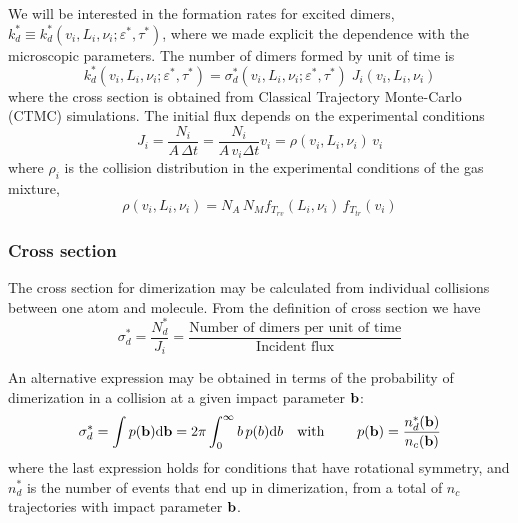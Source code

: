 We will be interested in the formation rates for excited dimers, $k_{d}^{*} \equiv k_{d}^{*}(v_{i}, L_{i}, \nu_{i} ; \varepsilon^{*}, \tau^{*})$, where we made explicit the dependence with the microscopic parameters. The number of dimers formed by unit of time is
\begin{equation}
  \label{Q:def-dimer-rate}
  k_{d}^{*}(v_{i}, L_{i}, \nu_{i} ; \varepsilon^{*}, \tau^{*}) = \sigma_{d}^{*}(v_{i}, L_{i}, \nu_{i} ; \varepsilon^{*}, \tau^{*}) \; J_{i}(v_{i}, L_{i}, \nu_{i} )
\end{equation}
where the cross section is obtained from Classical Trajectory Monte-Carlo (CTMC) simulations. The initial flux depends on the experimental conditions
\begin{equation}
  \label{Q:rates-flux}
  J_{i} =\frac{N_{i}}{A \,\Delta t} = \frac{N_{i}}{A \, v_{i} \Delta t} v_{i} = \rho(v_{i}, L_{i}, \nu_{i})\, v_{i}
\end{equation}
%
where $\rho_{i}$ is the collision distribution in the experimental conditions of the gas mixture,
\begin{equation}
  \label{Q:rates-def-collis-distrib}
  \rho(v_{i}, L_{i}, \nu_{i}) = N_{A} \, N_{M} f_{T_{rv}}(L_{i},\nu_{i}) \, f_{T_{tr}}(v_{i})
\end{equation}

\subsubsection{Cross section}
\label{S:cross-section}

The cross section for dimerization may be calculated from individual collisions between one atom and molecule. 
From the definition of cross section we have
\begin{equation*}
  \sigma_{d}^{*} = \frac{N_{d}^{*}}{J_{i}}= \frac{\text{Number of dimers per unit of time}}{\text{Incident flux}}
\end{equation*}

An alternative expression may be obtained in terms of the probability of dimerization in a collision at a given impact parameter $\mathbf{b}$:
\begin{align}
  \label{Q:rates-def-probab}
  \sigma_{d}^{*} = \int p(\mathbf{b}) \mathrm{d} \mathbf{b} = 2 \pi \int_{0}^{\infty} b \, p(b) \mathrm{d} b & \quad \text{with } \quad & p(\mathbf{b}) = \frac{n_{d}^{*}(\mathbf{b})}{n_{c}(\mathbf{b})}
\end{align}
where the last expression holds for conditions that have rotational symmetry, and $n_{d}^{*}$ is the number of events that end up in dimerization, from a total of $n_{c}$ trajectories with impact parameter $\mathbf{b}$.


